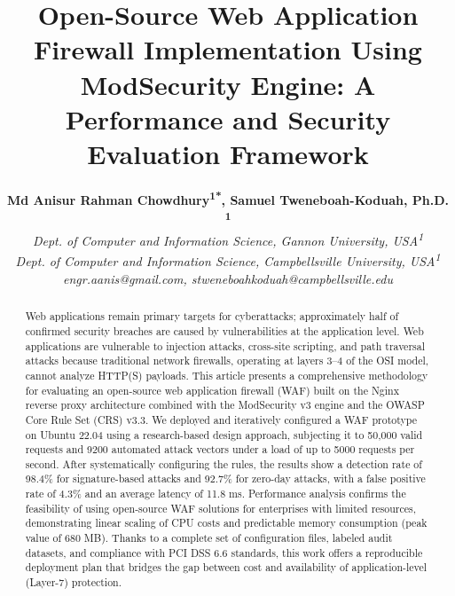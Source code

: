 \documentclass[10pt,conference]{IEEEtran}
\begin{document}
\title{Open-Source Web Application Firewall Implementation Using ModSecurity Engine: A Performance and Security Evaluation Framework}

\author{
\centering
\begin{tabular}{c}
\textbf{Md Anisur Rahman Chowdhury\textsuperscript{1*}, Samuel Tweneboah-Koduah, Ph.D. \textsuperscript{1}}\\
\textit{Dept. of Computer and Information Science, Gannon University, USA\textsuperscript{1}} \\
\textit{Dept. of Computer and Information Science, Campbellsville University, USA\textsuperscript{1}} \\
\textit{\small engr.aanis@gmail.com, stweneboahkoduah@campbellsville.edu}\\\end{tabular}
}
\maketitle

\begin{abstract}
Web applications remain primary targets for cyberattacks; approximately half of confirmed security breaches are caused by vulnerabilities at the application level. Web applications are vulnerable to injection attacks, cross-site scripting, and path traversal attacks because traditional network firewalls, operating at layers 3–4 of the OSI model, cannot analyze HTTP(S) payloads. This article presents a comprehensive methodology for evaluating an open-source web application firewall (WAF) built on the Nginx reverse proxy architecture combined with the ModSecurity v3 engine and the OWASP Core Rule Set (CRS) v3.3. We deployed and iteratively configured a WAF prototype on Ubuntu 22.04 using a research-based design approach, subjecting it to 50,000 valid requests and 9200 automated attack vectors under a load of up to 5000 requests per second. After systematically configuring the rules, the results show a detection rate of 98.4\% for signature-based attacks and 92.7\% for zero-day attacks, with a false positive rate of 4.3\% and an average latency of 11.8 ms. Performance analysis confirms the feasibility of using open-source WAF solutions for enterprises with limited resources, demonstrating linear scaling of CPU costs and predictable memory consumption (peak value of 680 MB). Thanks to a complete set of configuration files, labeled audit datasets, and compliance with PCI DSS 6.6 standards, this work offers a reproducible deployment plan that bridges the gap between cost and availability of application-level (Layer-7) protection.
\end{abstract}
\end{document}
